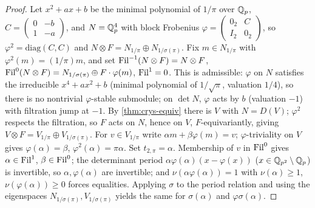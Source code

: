 \begin{proof}
  Let \(x^2 + ax + b\) be the minimal polynomial of \(1/\pi\) over \(\mathbb{Q}_p\),
  \(C = \left(\begin{smallmatrix} 0 & -b \\ 1 & -a \end{smallmatrix}\right)\),
  and \(N = \mathbb{Q}_p^4\) with block Frobenius
  \(\varphi = \left(\begin{smallmatrix} 0_2 & C \\ I_2 & 0_2 \end{smallmatrix}\right)\),
  so \(\varphi^2 = \mathrm{diag}(C, C)\) and \(N \otimes F = N_{1/\pi} \oplus
  N_{1/\sigma(\pi)}\). Fix \(m \in N_{1/\pi}\) with \(\varphi^2(m) = (1/\pi)m\),
  and set \(\mathrm{Fil}^{-1}(N \otimes F) = N \otimes F\), \(\mathrm{Fil}^0(N \otimes F) =
  N_{1/\sigma(\pi)} \oplus F \cdot \varphi(m)\), \(\mathrm{Fil}^1 = 0\). This is
  admissible: \(\varphi\) on \(N\) satisfies the irreducible \(x^4 + ax^2 + b\)
  (minimal polynomial of \(1/\sqrt{\pi}\), valuation \(1/4\)), so there is no
  nontrivial \(\varphi\)-stable submodule; on \(\det N\), \(\varphi\) acts by
  \(b\) (valuation \(-1\)) with filtration jump at \(-1\). By
  \cref{thm:crys-equiv} there is \(V\) with \(N = D(V)\); \(\varphi^2\) respects
  the filtration, so \(F\) acts on \(N\), hence on \(V\), \(F\)-equivariantly,
  giving \(V \otimes F = V_{1/\pi} \oplus V_{1/\sigma(\pi)}\). For \(v \in
  V_{1/\pi}\) write \(\alpha m + \beta \varphi(m) = v\); \(\varphi\)-triviality
  on \(V\) gives \(\varphi(\alpha) = \beta\), \(\varphi^2(\alpha) = \pi\alpha\).
  Set \(t_{2,\pi} = \alpha\). Membership of \(v\) in \(\mathrm{Fil}^0\) gives \(\alpha
  \in \mathrm{Fil}^1\), \(\beta \in \mathrm{Fil}^0\); the determinant period \(\alpha\varphi(\alpha)
  (x - \varphi(x))\) (\(x \in \mathbb{Q}_{p^2} \setminus \mathbb{Q}_p\)) is invertible, so
  \(\alpha, \varphi(\alpha)\) are invertible; and \(\nu(\alpha\varphi(\alpha)) =
  1\) with \(\nu(\alpha) \geq 1\), \(\nu(\varphi(\alpha)) \geq 0\) forces
  equalities. Applying \(\sigma\) to the period relation and using the eigenspaces
  \(N_{1/\sigma(\pi)}, V_{1/\sigma(\pi)}\) yields the same for \(\sigma(\alpha)\)
  and \(\varphi\sigma(\alpha)\).
\end{proof}

